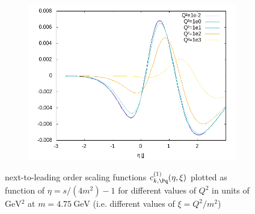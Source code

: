 \begin{figure}[ht!]
\begin{subfigure}[t]{.3\textwidth}
\end{subfigure}%
\begin{subfigure}[t]{.3\textwidth}
	\includegraphics[width=\textwidth]{../../img2/partonic/cq1_AA_x2g1}
\end{subfigure}%
\caption{next-to-leading order scaling functions $c_{k,\Pq}^{(1)}(\eta,\xi)$ plotted as function of $\eta=s/(4m^2)-1$ for different values of $Q^2$ in units of $\si{\GeV^2}$ at $m=\SI{4.75}{\GeV}$ (i.e. different values of $\xi=Q^2/m^2$) }\label{fig:cq1}
\end{figure}
